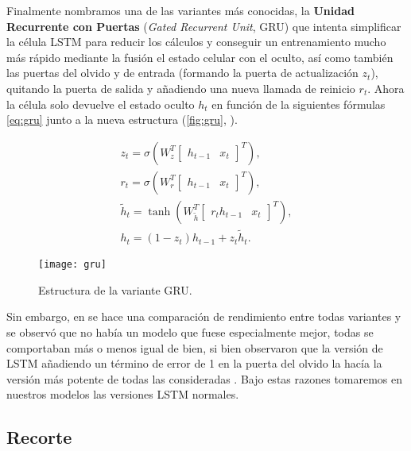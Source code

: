 Finalmente nombramos una de las variantes más conocidas, la \textbf{Unidad Recurrente con Puertas} (\emph{Gated Recurrent Unit}, GRU) \cite{cho2014learning} que intenta simplificar la célula LSTM para reducir los cálculos y conseguir un entrenamiento mucho más rápido mediante la fusión el estado celular con el oculto, así como también las puertas del olvido y de entrada (formando la puerta de actualización $z_t$), quitando la puerta de salida y añadiendo una nueva llamada de reinicio $r_t$. Ahora la célula solo devuelve el estado oculto $h_t$ en función de la siguientes fórmulas \eqref{eq:gru} junto a la nueva estructura (\autoref{fig:gru}, \cite{christopher2015lstm}).

\begin{gather}
  z_t = \sigma\left(W_z^T \begin{bmatrix} h_{t-1} & x_t \end{bmatrix}^T\right), \\
  r_t = \sigma\left(W_r^T \begin{bmatrix} h_{t-1} & x_t \end{bmatrix}^T \right), \\
  \widetilde{h}_t = \tanh\left(W_{\widetilde{h}}^T \begin{bmatrix} r_t h_{t-1} & x_t \end{bmatrix}^T\right), \\
  h_t = (1 - z_t)h_{t-1} + z_t \widetilde{h}_t.
  \label{eq:gru}
\end{gather}

\begin{figure}[htpb]
  \centering
  \texttt{[image: gru]}
  \caption{Estructura de la variante GRU.}
  \label{fig:gru}
\end{figure}

Sin embargo, en \cite{greff2016lstm} se hace una comparación de rendimiento entre todas variantes y se observó que no había un modelo que fuese especialmente mejor, todas se comportaban más o menos igual de bien, si bien \cite{gers1999learning} observaron que la versión de LSTM añadiendo un término de error de 1 en la puerta del olvido la hacía la versión más potente de todas las consideradas \cite{Goodfellow-et-al-2016}. Bajo estas razones tomaremos en nuestros modelos las versiones LSTM normales.

\subsection{Recorte}


